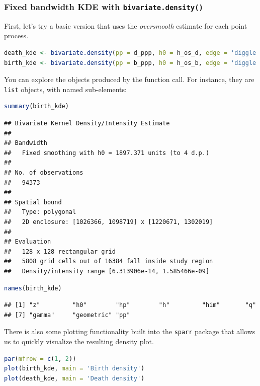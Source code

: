 \documentclass[
]{book}
\newcommand{\passthrough}[1]{#1}
\begin{document}
\hypertarget{fixed-bandwidth-kde-with-bivariate.density}{%
\subsubsection{\texorpdfstring{Fixed bandwidth KDE with \texttt{bivariate.density()}}{Fixed bandwidth KDE with bivariate.density()}}\label{fixed-bandwidth-kde-with-bivariate.density}}

First, let's try a basic version that uses the \emph{oversmooth} estimate for each point process.

\begin{lstlisting}[language=R]
death_kde <- bivariate.density(pp = d_ppp, h0 = h_os_d, edge = 'diggle')
birth_kde <- bivariate.density(pp = b_ppp, h0 = h_os_b, edge = 'diggle')
\end{lstlisting}

You can explore the objects produced by the function call. For instance, they are \passthrough{\lstinline!list!} objects, with named sub-elements:

\begin{lstlisting}[language=R]
summary(birth_kde)
\end{lstlisting}

\begin{lstlisting}
## Bivariate Kernel Density/Intensity Estimate
## 
## Bandwidth
##   Fixed smoothing with h0 = 1897.371 units (to 4 d.p.)
## 
## No. of observations
##   94373 
## 
## Spatial bound
##   Type: polygonal
##   2D enclosure: [1026366, 1098719] x [1220671, 1302019]
## 
## Evaluation
##   128 x 128 rectangular grid
##   5808 grid cells out of 16384 fall inside study region
##   Density/intensity range [6.313906e-14, 1.585466e-09]
\end{lstlisting}

\begin{lstlisting}[language=R]
names(birth_kde)
\end{lstlisting}

\begin{lstlisting}
## [1] "z"         "h0"        "hp"        "h"         "him"       "q"        
## [7] "gamma"     "geometric" "pp"
\end{lstlisting}

There is also some plotting functionality built into the \passthrough{\lstinline!sparr!} package that allows us to quickly visualize the resulting density plot.

\begin{lstlisting}[language=R]
par(mfrow = c(1, 2))
plot(birth_kde, main = 'Birth density')
plot(death_kde, main = 'Death density')
\end{lstlisting}
\end{document}
